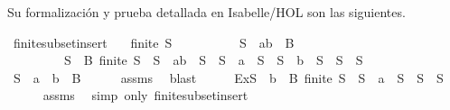 \begin{isabellebody}
\begin{isamarkuptext}
  Su formalización y prueba detallada en Isabelle/HOL son las siguientes.%
\end{isamarkuptext}\isamarkuptrue%
\isamarkupfalse%
\ finite{\isacharunderscore}subset{\isacharunderscore}insert{}{\isacharcolon}\isanewline
\ \ \ {\isachardoublequoteopen}finite\ S{\isachardoublequoteclose}\isanewline
\ \ \ \ \ \ \ \ \ \ {\isachardoublequoteopen}S\ {\isasymsubseteq}\ {\isacharbraceleft}a{\isacharcomma}b{\isacharbraceright}\ {\isasymunion}\ B{\isachardoublequoteclose}\isanewline
\ \ \ \ \ \ \ \ \ {\isachardoublequoteopen}{\isasymexists}S{\isacharprime}\ {\isasymsubseteq}\ B{\isachardot}\ finite\ S{\isacharprime}\ {\isasymand}\ {\isacharparenleft}S\ {\isacharequal}\ {\isacharbraceleft}a{\isacharcomma}b{\isacharbraceright}\ {\isasymunion}\ S{\isacharprime}\ {\isasymor}\ S\ {\isacharequal}\ {\isacharbraceleft}a{\isacharbraceright}\ {\isasymunion}\ S{\isacharprime}\ {\isasymor}\ S\ {\isacharequal}\ {\isacharbraceleft}b{\isacharbraceright}\ {\isasymunion}\ S{\isacharprime}\ {\isasymor}\ S\ {\isacharequal}\ S{\isacharprime}{\isacharparenright}{\isachardoublequoteclose}\isanewline
%
\isadelimproof
%
\endisadelimproof
%
\isatagproof
{}\isamarkupfalse%
\ {\isacharminus}\isanewline
\ \ \isamarkupfalse%
\ {\isachardoublequoteopen}S\ {\isasymsubseteq}\ {\isacharbraceleft}a{\isacharbraceright}\ {\isasymunion}\ {\isacharparenleft}{\isacharbraceleft}b{\isacharbraceright}\ {\isasymunion}\ B{\isacharparenright}{\isachardoublequoteclose}\isanewline
\ \ \ \ \isamarkupfalse%
\ assms{\isacharparenleft}{}{\isacharparenright}\ \isamarkupfalse%
\ blast\isanewline
\ \ \isamarkupfalse%
\ \isamarkupfalse%
\ Ex{}{\isacharcolon}{\isachardoublequoteopen}{\isasymexists}S{}\ {\isasymsubseteq}\ {\isacharparenleft}{\isacharbraceleft}b{\isacharbraceright}\ {\isasymunion}\ B{\isacharparenright}{\isachardot}\ finite\ S{}\ {\isasymand}\ {\isacharparenleft}S\ {\isacharequal}\ {\isacharbraceleft}a{\isacharbraceright}\ {\isasymunion}\ S{}\ {\isasymor}\ S\ {\isacharequal}\ S{}{\isacharparenright}{\isachardoublequoteclose}\isanewline
\ \ \ \ \isamarkupfalse%
\ assms{\isacharparenleft}{}{\isacharparenright}\ \isamarkupfalse%
\ {\isacharparenleft}simp\ only{\isacharcolon}\ finite{\isacharunderscore}subset{\isacharunderscore}insert{}{\isacharparenright}\isanewline
\ \ \isamarkupfalse%

\end{isabellebody}
